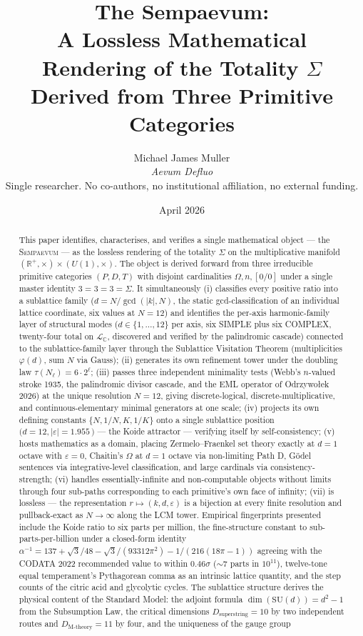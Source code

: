 \documentclass[11pt,a4paper]{article}
\title{\bfseries The Sempaevum:\\[2pt]
A Lossless Mathematical Rendering of the Totality $\Sigma$\\[2pt]
Derived from Three Primitive Categories}
\author{Michael James Muller\\
\small\textit{Aevum Defluo}\\[2pt]
\small Single researcher. No co-authors, no institutional affiliation, no external funding.}
\date{April 2026}
\theoremstyle{definition}
\theoremstyle{remark}
\newcommand{\R}{\mathbb{R}}
\newcommand{\C}{\mathbb{C}}
\newcommand{\Sempaevum}{\textsc{Sempaevum}}
\begin{document}
\maketitle

\begin{abstract}
\noindent
This paper identifies, characterises, and verifies a single mathematical object — the \Sempaevum{} — as the lossless rendering of the totality $\Sigma$ on the multiplicative manifold $(\R^{+},\times) \times (U(1),\times)$. The object is derived forward from three irreducible primitive categories $(P,D,T)$ with disjoint cardinalities $\Omega, n, [0/0]$ under a single master identity $3=3=3=\Sigma$. It simultaneously (i) classifies every positive ratio into a sublattice family ($d = N/\gcd(|k|,N)$, the static gcd-classification of an individual lattice coordinate, six values at $N=12$) and identifies the per-axis harmonic-family layer of structural modes ($d \in \{1,\ldots,12\}$ per axis, six SIMPLE plus six COMPLEX, twenty-four total on $\mathcal{L}_{\C}$, discovered and verified by the palindromic cascade) connected to the sublattice-family layer through the Sublattice Visitation Theorem (multiplicities $\varphi(d)$, sum $N$ via Gauss); (ii) generates its own refinement tower under the doubling law $\tau(N_{\ell}) = 6 \cdot 2^{\ell}$; (iii) passes three independent minimality tests (Webb's $n$-valued stroke 1935, the palindromic divisor cascade, and the EML operator of Odrzywołek 2026) at the unique resolution $N=12$, giving discrete-logical, discrete-multiplicative, and continuous-elementary minimal generators at one scale; (iv) projects its own defining constants $\{N, 1/N, K, 1/K\}$ onto a single sublattice position $(d=12, |\varepsilon|=1.955$\,\textcent$)$ — the Koide attractor — verifying itself by self-consistency; (v) hosts mathematics as a domain, placing Zermelo--Fraenkel set theory exactly at $d=1$ octave with $\varepsilon=0$, Chaitin's $\Omega$ at $d=1$ octave via non-limiting Path D, Gödel sentences via integrative-level classification, and large cardinals via consistency-strength; (vi) handles essentially-infinite and non-computable objects without limits through four sub-paths corresponding to each primitive's own face of infinity; (vii) is lossless — the representation $r \mapsto (k,d,\varepsilon)$ is a bijection at every finite resolution and pullback-exact as $N \to \infty$ along the LCM tower. Empirical fingerprints presented include the Koide ratio to six parts per million, the fine-structure constant to sub-parts-per-billion under a closed-form identity $\alpha^{-1} = 137 + \sqrt{3}/48 - \sqrt{3}/(93312\pi^{2}) - 1/(216(18\pi-1))$ agreeing with the CODATA 2022 recommended value to within $0.46\sigma$ ($\sim 7$ parts in $10^{11}$), twelve-tone equal temperament's Pythagorean comma as an intrinsic lattice quantity, and the step counts of the citric acid and glycolytic cycles. The sublattice structure derives the physical content of the Standard Model: the adjoint formula $\dim(\mathrm{SU}(d)) = d^{2}-1$ from the Subsumption Law, the critical dimensions $D_{\mathrm{superstring}} = 10$ by two independent routes and $D_{\mathrm{M\text{-}theory}} = 11$ by four, and the uniqueness of the gauge group 
\end{abstract}
\end{document}
